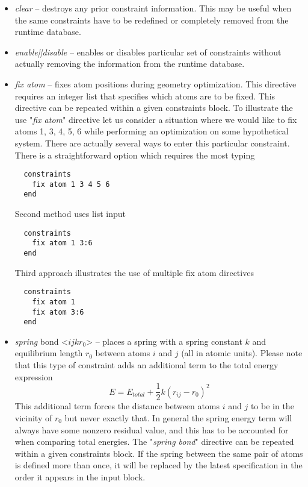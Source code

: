 \begin{itemize}
\item {\it clear} -- destroys any prior constraint information.  This may be
useful when the same constraints have to be redefined or completely removed from
the runtime database.

\item {\it enable||disable} -- enables or
disables particular set of constraints without actually removing the
information from the runtime database.

\item {\it fix atom} -- fixes atom positions during geometry optimization. This
directive requires an integer list that specifies which atoms are to be
fixed. This directive can be repeated within a given constraints block. 
To illustrate the use "{\it fix atom}" directive let us
consider a situation where we would like to fix atoms 1, 3, 4, 5, 6 while performing an optimization on some hypothetical system. 
There are actually several
ways to enter this particular constraint. 
There is a straightforward option which requires the most typing

\begin{verbatim}
  constraints
    fix atom 1 3 4 5 6
  end
\end{verbatim}

Second method uses list input
\begin{verbatim}
  constraints
    fix atom 1 3:6
  end
\end{verbatim}

Third approach illustrates the use of multiple fix atom directives
\begin{verbatim}
  constraints
    fix atom 1
    fix atom 3:6
  end
\end{verbatim}

\item {\it spring} bond <$i j  k r_0$> -- places a spring with a spring constant $k$ and equilibrium length $r_0$
between atoms $i$ and $j$ (all in atomic units). Please note that this type of constraint adds an additional term to 
the total energy expression
\[
E=E_{total}+\frac{1}{2}k(r_{ij}-r_0)^2
\]
This additional term forces the distance between atoms $i$ and $j$ to be in the vicinity of $r_0$ but never exactly that. In general
the spring energy term will always have some nonzero residual value, and this has to be accounted for when comparing total
energies. The "{\it spring bond}" directive can be repeated within a given constraints block. If the spring between the same pair of atoms
is defined more than once, it will be replaced by the latest specification in the order it appears in the input block.
\end{itemize}

